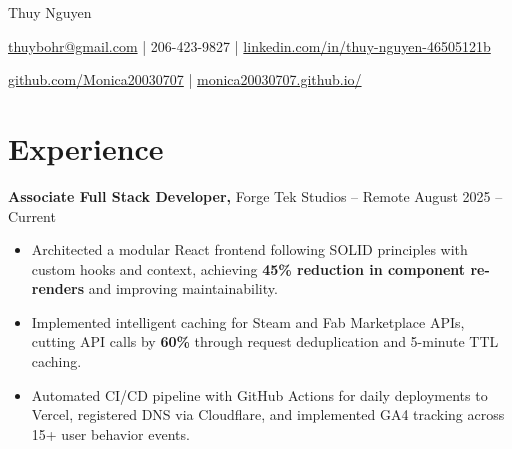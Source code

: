 \documentclass[11pt]{article}       %
\begin{document}
\centerline{\Huge Thuy Nguyen}

\vspace{5pt}

\centerline{\href{mailto:thuybohr@gmail.com}{thuybohr@gmail.com} | 206-423-9827 |
\href{https://www.linkedin.com/in/thuy-nguyen-46505121b/}{linkedin.com/in/thuy-nguyen-46505121b}}

\centerline{\href{https://github.com/Monica20030707}{github.com/Monica20030707} |
\href{https://monica20030707.github.io/}{monica20030707.github.io/}}

\vspace{-9pt}

\section*{Experience}

\textbf{Associate Full Stack Developer,} {Forge Tek Studios} -- Remote \hfill August 2025 -- Current
\vspace{-9pt}
\begin{itemize}
  \item Architected a modular React frontend following SOLID principles with custom hooks and context, achieving \textbf{45\% reduction in component re-renders} and improving maintainability.
  \item Implemented intelligent caching for Steam and Fab Marketplace APIs, cutting API calls by \textbf{60\%} through request deduplication and 5-minute TTL caching.
  \item Automated CI/CD pipeline with GitHub Actions for daily deployments to Vercel, registered DNS via Cloudflare, and implemented GA4 tracking across 15+ user behavior events.
\end{itemize}
\end{document}
